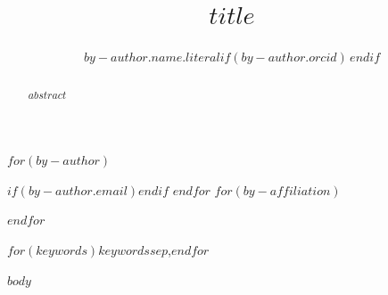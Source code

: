 \documentclass[preprint,12pt,authoryear]{elsarticle}
\begin{document}
\begin{frontmatter}
\title{$title$}
$for(by-author)$
\author[$for(by-author.affiliations)$$by-author.affiliations.id$$sep$,$endfor$]{$by-author.name.literal$$if(by-author.orcid)$\,$endif$}
$if(by-author.email)$$endif$
$endfor$
$for(by-affiliation)$
\address[$by-affiliation.id$]{$by-affiliation.name$}
$endfor$
\begin{abstract}
$abstract$
\end{abstract}
\begin{keyword}
$for(keywords)$$keywords$$sep$\sep $endfor$
\end{keyword}
\end{frontmatter}
$body$


\end{document}
